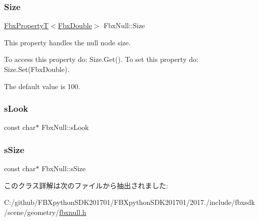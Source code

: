 \mbox{\label{class_fbx_null_a20a712e7191ecd9eb6570a4a50293a40}} 
\subsubsection{\texorpdfstring{Size}{Size}}
{\footnotesize\ttfamily \hyperlink{class_fbx_property_t}{Fbx\+PropertyT}$<$\hyperlink{fbxtypes_8h_a171e72a1c46fc15c1a6c9c31948c1c5b}{Fbx\+Double}$>$ Fbx\+Null\+::\+Size}

This property handles the null node size.

To access this property do\+: Size.\+Get(). To set this property do\+: Size.\+Set(\+Fbx\+Double).

The default value is 100. \mbox{\label{class_fbx_null_ac3a4f7217a304a8fd5d9259329874fc2}} 
\subsubsection{\texorpdfstring{s\+Look}{sLook}}
{\footnotesize\ttfamily const char$\ast$ Fbx\+Null\+::s\+Look\hspace{0.3cm}{\ttfamily [static]}}

\mbox{\label{class_fbx_null_a4478c6006aabcab2bf8ca2a7b3677601}} 
\subsubsection{\texorpdfstring{s\+Size}{sSize}}
{\footnotesize\ttfamily const char$\ast$ Fbx\+Null\+::s\+Size\hspace{0.3cm}{\ttfamily [static]}}



このクラス詳解は次のファイルから抽出されました\+:\begin{DoxyCompactItemize}
\item 
C\+:/github/\+F\+B\+Xpython\+S\+D\+K201701/\+F\+B\+Xpython\+S\+D\+K201701/2017./include/fbxsdk/scene/geometry/\hyperlink{fbxnull_8h}{fbxnull.\+h}\end{DoxyCompactItemize}
